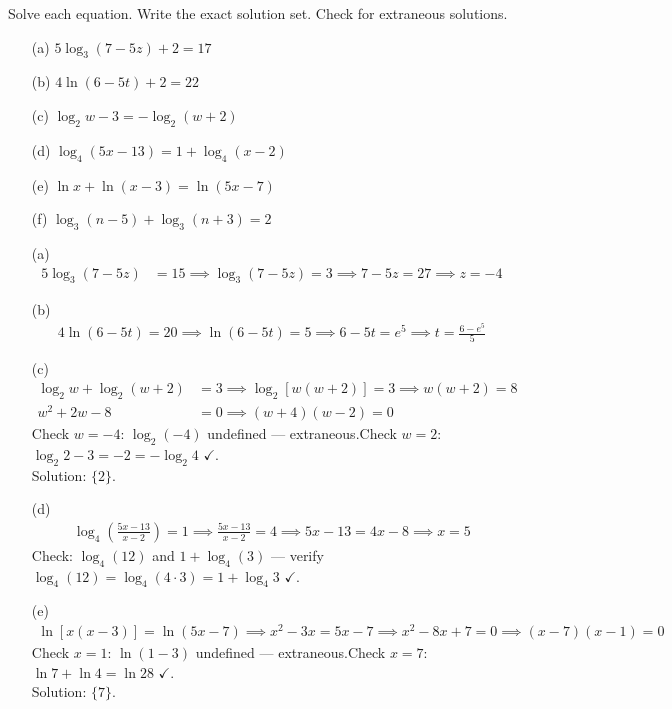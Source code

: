 \documentclass{ximera}
\begin{document}
\begin{problem}
Solve each equation. Write the exact solution set. Check for extraneous solutions.
\begin{enumerate}
  \item[(a)] $5\log_3 (7 - 5z) + 2 = 17$
  \medskip
  \item[(b)] $4\ln (6 - 5t) + 2 = 22$
  \medskip
  \item[(c)] $\log_2 w - 3 = -\log_2 (w+2)$
  \medskip
  \item[(d)] $\log_4(5x - 13) = 1 + \log_4 (x-2)$
  \medskip
  \item[(e)] $\ln x + \ln (x-3) = \ln (5x - 7)$
  \medskip
  \item[(f)] $\log_3 (n-5) + \log_3 (n+3) = 2$
\end{enumerate}

\begin{solution}
\begin{enumerate}
  \item[(a)]
  \begin{align*}
    5\log_3(7-5z) &= 15 \implies \log_3(7-5z)=3 \implies 7-5z=27 \implies \boxed{z=-4}
  \end{align*}

  \item[(b)]
  \begin{align*}
    4\ln(6-5t) = 20 \implies \ln(6-5t)=5 \implies 6-5t=e^5 \implies \boxed{t=\frac{6-e^5}{5}}
  \end{align*}

  \item[(c)]
  \begin{align*}
    \log_2 w + \log_2(w+2) &= 3 \implies \log_2[w(w+2)]=3 \implies w(w+2)=8\\
    w^2+2w-8&=0 \implies (w+4)(w-2)=0
  \end{align*}
  Check $w=-4$: $\log_2(-4)$ undefined — extraneous.\quad Check $w=2$: $\log_2 2 - 3 = -2 = -\log_2 4$ $\checkmark$.\\
  Solution: $\{2\}$.

  \item[(d)]
  \begin{align*}
    \log_4\!\left(\frac{5x-13}{x-2}\right) = 1 \implies \frac{5x-13}{x-2}=4 \implies 5x-13=4x-8 \implies \boxed{x=5}
  \end{align*}
  Check: $\log_4(12)$ and $1+\log_4(3)$ — verify $\log_4(12)=\log_4(4\cdot 3)=1+\log_4 3$ $\checkmark$.

  \item[(e)]
  \begin{align*}
    \ln[x(x-3)] = \ln(5x-7) \implies x^2-3x=5x-7 \implies x^2-8x+7=0 \implies (x-7)(x-1)=0
  \end{align*}
  Check $x=1$: $\ln(1-3)$ undefined — extraneous.\quad Check $x=7$: $\ln 7+\ln 4=\ln 28$ $\checkmark$.\\
  Solution: $\{7\}$.


\end{enumerate}
\end{solution}
\end{problem}
\end{document}
